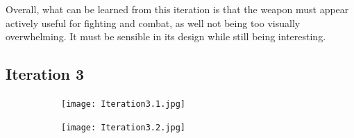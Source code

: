 \documentclass{article}
\begin{document}
Overall, what can be learned from this iteration is that the weapon must appear actively useful for fighting and combat, as well not being too visually overwhelming. It must be sensible in its design while still being interesting.

\pagebreak

\subsection{Iteration 3} \label{Iteration3}

\begin{figure}[h]
    \centering
    \caption{}
    \label{fig:Iteration3}
    \begin{subfigure}{0.3\textwidth}
        \texttt{[image: Iteration3.1.jpg]}
        \caption{}
        \label{fig:Iteration3.1}
    \end{subfigure}
    \begin{subfigure}{0.3\textwidth}
        \texttt{[image: Iteration3.2.jpg]}
        \caption{}
        \label{fig:Iteration3.2}
    \end{subfigure}
\end{figure}



\pagebreak

\printbibliography

\pagebreak

\listoffigures
\end{document}
